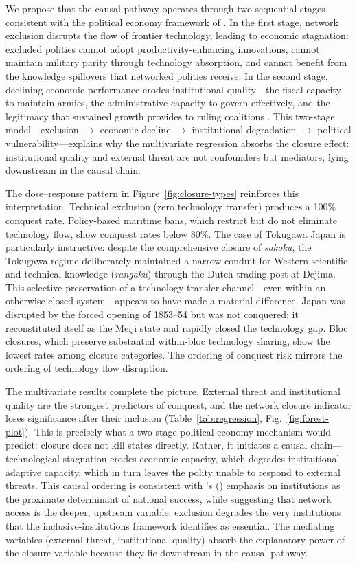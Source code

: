 \documentclass[pdflatex,sn-basic]{sn-jnl}
\theoremstyle{thmstyleone}%
\theoremstyle{thmstyletwo}%
\theoremstyle{thmstylethree}%
\begin{document}
We propose that the causal pathway operates through two sequential stages, consistent with the political economy framework of \citet{BesleyPersson2011}. In the first stage, network exclusion disrupts the flow of frontier technology, leading to economic stagnation: excluded polities cannot adopt productivity-enhancing innovations, cannot maintain military parity through technology absorption, and cannot benefit from the knowledge spillovers that networked polities receive. In the second stage, declining economic performance erodes institutional quality---the fiscal capacity to maintain armies, the administrative capacity to govern effectively, and the legitimacy that sustained growth provides to ruling coalitions \citep{AcemogluRobinson2006}. This two-stage model---exclusion $\to$ economic decline $\to$ institutional degradation $\to$ political vulnerability---explains why the multivariate regression absorbs the closure effect: institutional quality and external threat are not confounders but mediators, lying downstream in the causal chain.

The dose--response pattern in Figure~\ref{fig:closure-types} reinforces this interpretation. Technical exclusion (zero technology transfer) produces a 100\% conquest rate. Policy-based maritime bans, which restrict but do not eliminate technology flow, show conquest rates below 80\%. The case of Tokugawa Japan is particularly instructive: despite the comprehensive closure of \emph{sakoku}, the Tokugawa regime deliberately maintained a narrow conduit for Western scientific and technical knowledge (\emph{rangaku}) through the Dutch trading post at Dejima. This selective preservation of a technology transfer channel---even within an otherwise closed system---appears to have made a material difference. Japan was disrupted by the forced opening of 1853--54 but was not conquered; it reconstituted itself as the Meiji state and rapidly closed the technology gap. Bloc closures, which preserve substantial within-bloc technology sharing, show the lowest rates among closure categories. The ordering of conquest risk mirrors the ordering of technology flow disruption.

The multivariate results complete the picture. External threat and institutional quality are the strongest predictors of conquest, and the network closure indicator loses significance after their inclusion (Table~\ref{tab:regression}, Fig.~\ref{fig:forest-plot}). This is precisely what a two-stage political economy mechanism would predict: closure does not kill states directly. Rather, it initiates a causal chain---technological stagnation erodes economic capacity, which degrades institutional adaptive capacity, which in turn leaves the polity unable to respond to external threats. This causal ordering is consistent with \citeauthor{AcemogluRobinson2012}'s (\citeyear{AcemogluRobinson2012}) emphasis on institutions as the proximate determinant of national success, while suggesting that network access is the deeper, upstream variable: exclusion degrades the very institutions that the inclusive-institutions framework identifies as essential. The mediating variables (external threat, institutional quality) absorb the explanatory power of the closure variable because they lie downstream in the causal pathway.
\end{document}
